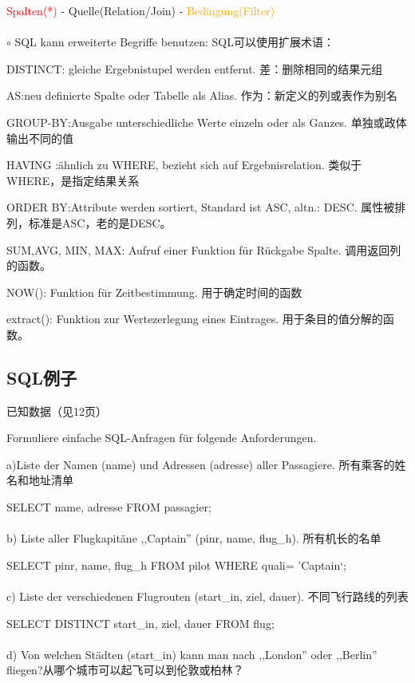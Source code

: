 \documentclass[fleqn]{article}
\begin{document}
\textcolor{red}{Spalten(*)} - \textcolor[RGB]{84,139,84}{Quelle(Relation/Join)} \qquad - \textcolor{orange}{Bedingung(Filter)}
\\
\\
$\circ$ SQL kann erweiterte Begriffe benutzen: SQL可以使用扩展术语：

DISTINCT: gleiche Ergebnistupel werden entfernt. 差：删除相同的结果元组

AS:neu definierte Spalte oder Tabelle als Alias. 作为：新定义的列或表作为别名

GROUP-BY:Ausgabe unterschiedliche Werte einzeln oder als Ganzes. 单独或政体输出不同的值

HAVING :ähnlich zu WHERE, bezieht sich auf Ergebnisrelation. 类似于WHERE，是指定结果关系

ORDER BY:Attribute werden sortiert, Standard ist ASC, altn.: DESC. 属性被排列，标准是ASC，老的是DESC。

SUM,AVG, MIN, MAX:  Aufruf einer Funktion für Rückgabe Spalte. 调用返回列的函数。

NOW(): Funktion für Zeitbestimmung. 用于确定时间的函数

extract(): Funktion zur Wertezerlegung eines Eintrages. 用于条目的值分解的函数。

\subsection{SQL例子}

已知数据（见12页）

\noindent Formuliere einfache SQL-Anfragen für folgende Anforderungen.

\noindent a)Liste der Namen (name) und Adressen (adresse) aller Passagiere. 所有乘客的姓名和地址清单

SELECT name, adresse FROM passagier;
\\
\\
\noindent b) Liste aller Flugkapitäne ,,Captain'' (pinr, name, flug\_h). 所有机长的名单

SELECT pinr, name, flug\_h FROM pilot WHERE quali= 'Captain‘;
\\
\\
\noindent c) Liste der verschiedenen Flugrouten (start\_in, ziel, dauer). 不同飞行路线的列表

SELECT DISTINCT start\_in, ziel, dauer FROM flug;
\\
\\
\noindent d) Von welchen Städten (start\_in) kann man nach ,,London'' oder ,,Berlin'' fliegen?从哪个城市可以起飞可以到伦敦或柏林？
\end{document}

